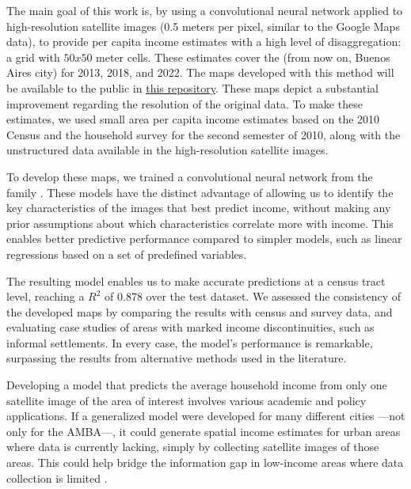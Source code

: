 \documentclass[conference]{IEEEtran}
\begin{document}
The main goal of this work is, by using a convolutional neural network applied to high-resolution satellite images (0.5 meters per pixel, similar to the Google Maps data), to provide per capita income estimates with a high level of disaggregation: a grid with $50x50$ meter cells. These estimates cover the  (from now on, Buenos Aires city) for 2013, 2018, and 2022. The maps developed with this method will be available to the public in \href{https://zenodo.org/records/11200070?token=eyJhbGciOiJIUzUxMiJ9.eyJpZCI6IjNhYWNhMDRiLTMwYTEtNDEwMy04MDIwLTA3ZDEzMTlmZTgwYiIsImRhdGEiOnt9LCJyYW5kb20iOiI2MWU4ODAwZjNlYTk0ZGRlOWU1MjIyZWY1YTU5OTk1MyJ9.KvBZ93q8Vt13e0eFxB5mFxBHmuGBZja0pfk4Gse1x0rXCTLioCvFLoXTpD7HkCQCUBpMxuDlL_tqsk8YjJqGMQ}{this repository}. These maps depict a substantial improvement regarding the resolution of the original data. To make these estimates, we used small area per capita income estimates based on the 2010 Census and the household survey for the second semester of 2010, along with the unstructured data available in the high-resolution satellite images.

To develop these maps, we trained a convolutional neural network from the  family \citep{EfficientNetV2}. These models have the distinct advantage of allowing us to identify the key characteristics of the images that best predict income, without making any prior assumptions about which characteristics correlate more with income. This enables better predictive performance compared to simpler models, such as linear regressions based on a set of predefined variables.

The resulting model enables us to make accurate predictions at a census tract level, reaching a $R^2$ of 0.878 over the test dataset. We assessed the consistency of the developed maps by comparing the results with census and survey data, and evaluating case studies of areas with marked income discontinuities, such as informal settlements. In every case, the model’s performance is remarkable, surpassing the results from alternative methods used in the literature.

Developing a model that predicts the average household income from only one satellite image of the area of interest involves various academic and policy applications. If a generalized model were developed for many different cities —not only for the AMBA—,  it could generate spatial income estimates for urban areas where data is currently lacking, simply by collecting satellite images of those areas. This could help bridge the information gap in low-income areas where data collection is limited \citep{burke2021}.
\end{document}
